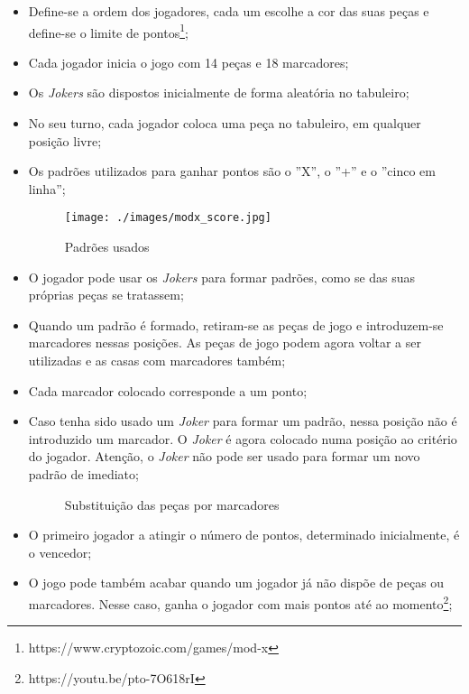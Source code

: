 \documentclass[a4paper]{article}
\begin{document}
\begin{itemize}
	\item Define-se a ordem dos jogadores, cada um escolhe a cor das suas peças e define-se o limite de pontos\footnote{https://www.cryptozoic.com/games/mod-x};
	\item Cada jogador inicia o jogo com 14 peças e 18 marcadores;
	\item Os \textit{Jokers} são dispostos inicialmente de forma aleatória no tabuleiro; 
	\item No seu turno, cada jogador coloca uma peça no tabuleiro, em qualquer posição livre;
	\item Os padrões utilizados para ganhar pontos são o ''X'', o ''+'' e o ''cinco em linha'';
	
	\begin{figure}[h!]
		\begin{center}
			\texttt{[image: ./images/modx\_score.jpg]}
			\caption{Padrões usados}
			\label{fig:2}
		\end{center}
	\end{figure}
	
	\item O jogador pode usar os \textit{Jokers} para formar padrões, como se das suas próprias peças se tratassem;
	\item Quando um padrão é formado, retiram-se as peças de jogo e introduzem-se marcadores nessas posições. As peças de jogo podem agora voltar a ser utilizadas e as casas com marcadores também;
	\item Cada marcador colocado corresponde a um ponto;
	\item Caso tenha sido usado um \textit{Joker} para formar um padrão, nessa posição não é introduzido um marcador. O \textit{Joker} é agora colocado numa posição ao critério do jogador. Atenção, o \textit{Joker} não pode ser usado para formar um novo padrão de imediato; 
	
	\begin{figure}[!h]
		\centering
		\hfill
		\caption{Substituição das peças por marcadores}
	\end{figure}
	
	\item O primeiro jogador a atingir o número de pontos, determinado inicialmente, é o vencedor;
	\item O jogo pode também acabar quando um jogador já não dispõe de peças ou marcadores. Nesse caso, ganha o jogador com mais pontos até ao momento\footnote{https://youtu.be/pto-7O618rI};
	

	
\end{itemize}
\end{document}
